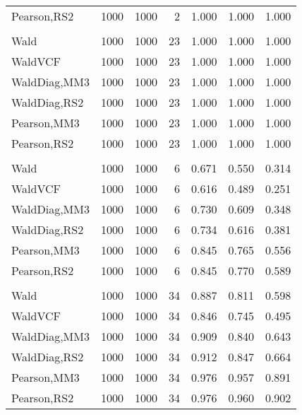 \documentclass[
]{article}
\begin{document}
\begin{table}[H]
{\begin{tabular}[t]{lrrrrrr}
\hspace{1em}Pearson,RS2 & 1000 & 1000 & 2 & 1.000 & 1.000 & 1.000\\
\addlinespace[0.3em]
\multicolumn{7}{l}{\textbf{1F 15V}}\\
\hspace{1em}Wald & 1000 & 1000 & 23 & 1.000 & 1.000 & 1.000\\
\hspace{1em}WaldVCF & 1000 & 1000 & 23 & 1.000 & 1.000 & 1.000\\
\hspace{1em}WaldDiag,MM3 & 1000 & 1000 & 23 & 1.000 & 1.000 & 1.000\\
\hspace{1em}WaldDiag,RS2 & 1000 & 1000 & 23 & 1.000 & 1.000 & 1.000\\
\hspace{1em}Pearson,MM3 & 1000 & 1000 & 23 & 1.000 & 1.000 & 1.000\\
\hspace{1em}Pearson,RS2 & 1000 & 1000 & 23 & 1.000 & 1.000 & 1.000\\
\addlinespace[0.3em]
\multicolumn{7}{l}{\textbf{2F 10V}}\\
\hspace{1em}Wald & 1000 & 1000 & 6 & 0.671 & 0.550 & 0.314\\
\hspace{1em}WaldVCF & 1000 & 1000 & 6 & 0.616 & 0.489 & 0.251\\
\hspace{1em}WaldDiag,MM3 & 1000 & 1000 & 6 & 0.730 & 0.609 & 0.348\\
\hspace{1em}WaldDiag,RS2 & 1000 & 1000 & 6 & 0.734 & 0.616 & 0.381\\
\hspace{1em}Pearson,MM3 & 1000 & 1000 & 6 & 0.845 & 0.765 & 0.556\\
\hspace{1em}Pearson,RS2 & 1000 & 1000 & 6 & 0.845 & 0.770 & 0.589\\
\addlinespace[0.3em]
\multicolumn{7}{l}{\textbf{3F 15V}}\\
\hspace{1em}Wald & 1000 & 1000 & 34 & 0.887 & 0.811 & 0.598\\
\hspace{1em}WaldVCF & 1000 & 1000 & 34 & 0.846 & 0.745 & 0.495\\
\hspace{1em}WaldDiag,MM3 & 1000 & 1000 & 34 & 0.909 & 0.840 & 0.643\\
\hspace{1em}WaldDiag,RS2 & 1000 & 1000 & 34 & 0.912 & 0.847 & 0.664\\
\hspace{1em}Pearson,MM3 & 1000 & 1000 & 34 & 0.976 & 0.957 & 0.891\\
\hspace{1em}Pearson,RS2 & 1000 & 1000 & 34 & 0.976 & 0.960 & 0.902\\
\bottomrule
\end{tabular}}
\endgroup{}
\end{table}
\end{document}
